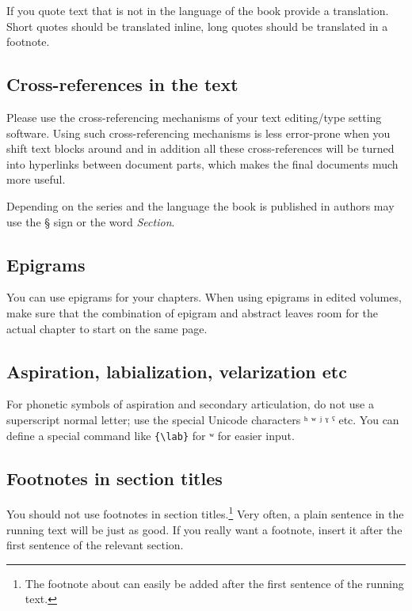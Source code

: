 {If you quote text that is not in the language of the book provide a translation. Short quotes should
be translated inline, long quotes should be translated in a footnote.




\subsection{Cross-references in the text}

Please use the cross-referencing mechanisms of your text editing/type setting software. Using such
cross-referencing mechanisms is less error-prone when you shift text blocks around and in addition
all these cross-references will be turned into hyperlinks between document parts, which makes the
final documents much more useful.


 
Depending on the series and the language the book is published in authors may  use the § sign or the word \emph{Section}. 

\subsection{Epigrams}
You can use epigrams for your chapters. When using epigrams in edited volumes, make sure that the combination of epigram and abstract leaves room for the actual chapter to start on the same page.

\subsection{Aspiration, labialization, velarization etc}
For phonetic symbols of aspiration and secondary articulation, do not use a superscript normal letter; use the special Unicode characters ʰ ʷ ʲ ˠ ˤ etc. You can define a special command like \verb+{\lab}+ for ʷ for easier input. 

\subsection{Footnotes in section titles}\label{sec:footnote}
You should not use footnotes in section titles.\footnote{The footnote about  can easily be added after the first sentence of the running text.} Very often, a plain sentence in the running text will be just as good. If you really want a footnote, insert it after the first sentence of the relevant section.

}
